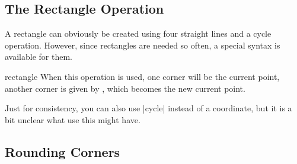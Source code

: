 \subsection{The Rectangle Operation}

A rectangle can obviously be created using four straight lines and a
cycle operation. However, since rectangles are needed so often, a
special syntax is available for them.

\begin{pathoperation}{rectangle}{}
  When this operation is used, one corner will be the current point,
  another corner is given by , which becomes the new
  current point. 

\begin{codeexample}[]
\end{codeexample}

  Just for consistency, you can also use |cycle| instead of a
  coordinate, but it is a bit unclear what use this might have.
\end{pathoperation}


\subsection{Rounding Corners}

